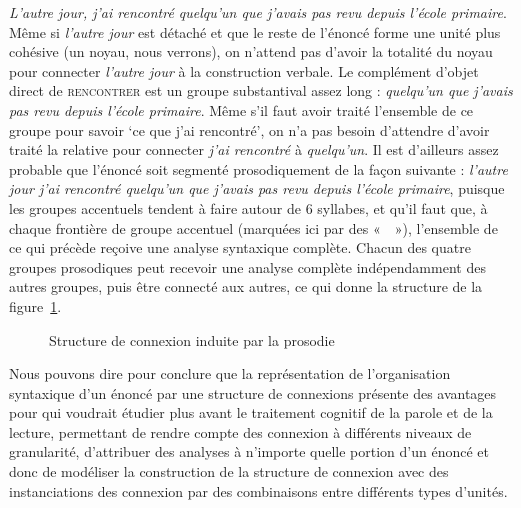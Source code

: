 {    \ea\label{ex:incremental}
    \textit{L’autre jour, j’ai rencontré quelqu’un que j’avais pas revu depuis l’école primaire}.
    \z
    Même si \textit{l’autre jour} est détaché et que le reste de l’énoncé forme une unité plus cohésive (un noyau, nous verrons), on n’attend pas d’avoir la totalité du noyau pour connecter \textit{l’autre jour} à la construction verbale. Le complément d’objet direct de \textsc{rencontrer} est un groupe substantival assez long : \textit{quelqu’un que j’avais pas revu depuis l’école primaire}. Même s’il faut avoir traité l’ensemble de ce groupe pour savoir ‘ce que j’ai rencontré’, on n’a pas besoin d’attendre d’avoir traité la relative pour connecter \textit{j’ai rencontré} à \textit{quelqu’un}. Il est d’ailleurs assez probable que l’énoncé  soit segmenté prosodiquement de la façon suivante : \textit{l’autre jour {\textbar} j’ai rencontré quelqu’un {\textbar} que j’avais pas revu {\textbar} depuis l’école primaire}, puisque les groupes accentuels tendent à faire autour de 6 syllabes, et qu’il faut que, à chaque frontière de groupe accentuel (marquées ici par des «~\textit{{\textbar}}~»), l’ensemble de ce qui précède reçoive une analyse syntaxique complète. Chacun des quatre groupes prosodiques peut recevoir une analyse complète indépendamment des autres groupes, puis être connecté aux autres, ce qui donne la structure de la figure~\ref{fig:rencontre}.

    \begin{figure}[H]
    \caption{Structure de connexion induite par la prosodie}
    \label{fig:rencontre}
    \end{figure}

    Nous pouvons dire pour conclure que la représentation de l’organisation syntaxique d’un énoncé par une structure de connexions présente des avantages pour qui voudrait étudier plus avant le traitement cognitif de la parole et de la lecture, permettant de rendre compte des connexion à différents niveaux de granularité, d’attribuer des analyses à n’importe quelle portion d’un énoncé et donc de modéliser la construction de la structure de connexion avec des instanciations des connexion par des combinaisons entre différents types d'unités.
}
